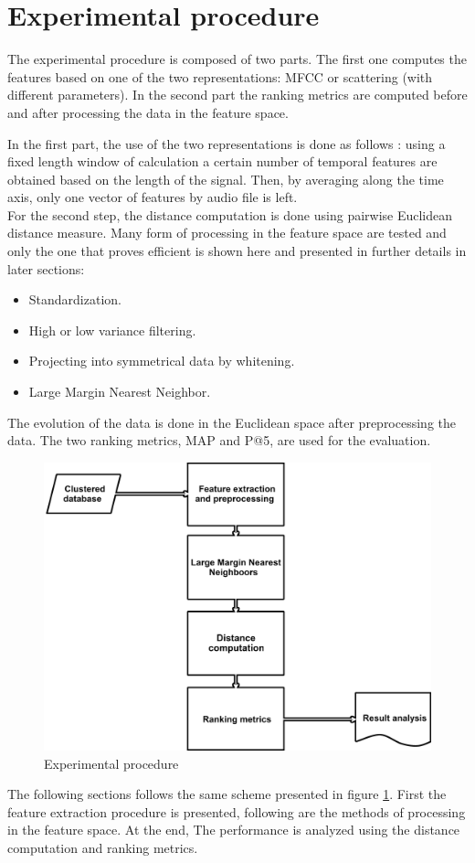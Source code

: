 \documentclass[hidelinks,12pt]{report}
\begin{document}
\section{Experimental procedure}
The experimental procedure is composed of two parts. The first one computes the features based on one of the two representations: MFCC or scattering (with different parameters). In the second part the ranking metrics are computed before and after processing the data in the feature space.\par
In the first part, the use of the two representations is done as follows : using a fixed length window of calculation a certain number of temporal features are obtained based on the length of the signal. Then, by averaging along the time axis, only one vector of features by audio file is left.\\ 
For the second step, the distance computation is done using pairwise Euclidean distance measure. Many form of processing in the feature space are tested and only the one that proves efficient is shown here and presented in further details in later sections:
\begin{itemize}
\item Standardization.
\item High or low variance filtering.
\item Projecting into symmetrical data by whitening.
\item Large Margin Nearest Neighbor.\cite{W09}\\
\end{itemize}

The evolution of the data is done in the Euclidean space after preprocessing the data. The two ranking metrics, MAP and P@5, are used for the evaluation.


\begin{figure}[t!]
  
  \centering
	    \includegraphics[width=1\textwidth]{experimental_procedure}
    \caption{Experimental procedure }
    \label{experiment}
\end{figure}
The following sections follows the same scheme presented in figure \ref{experiment}. First the feature extraction procedure is presented, following are the methods of processing in the feature space. At the end, The performance is analyzed using the distance computation and ranking metrics.
\end{document}
